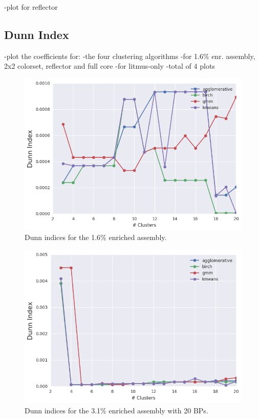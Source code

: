 \clearpage

-plot for reflector


\subsection{Dunn Index}
\label{subsec:chap11-dunn-index}

-plot the coefficients for:
  -the four clustering algorithms
  -for 1.6\% enr. assembly, 2x2 colorset, reflector and full core
  -for litmus-only
  -total of 4 plots

\clearpage

\begin{figure}[h!]
\centering
\includegraphics[width=0.87\linewidth]{figures/results/model-select/assm-16/dunn-combined-U238-capture-1}
\vspace{2mm}
\caption[Dunn indices for the 1.6\% enriched assembly]{Dunn indices for the 1.6\% enriched assembly.}
\label{fig:chap11-assm-16-dunn-index}
\end{figure}

\begin{figure}[h!]
\centering
\includegraphics[width=0.87\linewidth]{figures/results/model-select/assm-31-20BPs/dunn-combined-U238-capture-1}
\vspace{2mm}
\caption[Dunn indices for the 3.1\% enriched assembly with 20 BPs]{Dunn indices for the 3.1\% enriched assembly with 20 \acp{BP}.}
\label{fig:chap11-assm-31-20BPs-dunn-index}
\end{figure}

